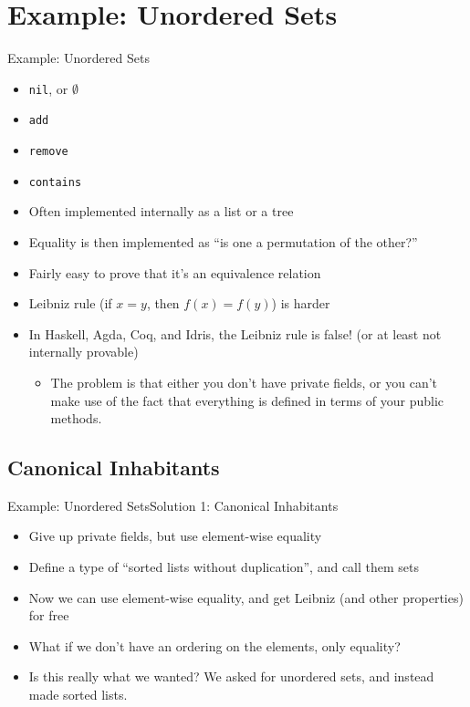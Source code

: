 \documentclass{beamer}
\begin{document}
\section{Example: Unordered Sets}
\begin{frame}{Example: Unordered Sets}
  \pause
  \begin{itemize}
    \item \texttt{nil}, or $\emptyset$ \pause
    \item \texttt{add} \pause
    \item \texttt{remove} \pause
    \item \texttt{contains} \pause
    \item Often implemented internally as a list or a tree \pause
    \item Equality is then implemented as ``is one a permutation of the other?'' \pause
    \item Fairly easy to prove that it's an equivalence relation \pause
    \item Leibniz rule (if $x = y$, then $f(x) = f(y)$) is harder
    \item In Haskell, Agda, Coq, and Idris, the Leibniz rule is false! \pause (or at least not internally provable) \pause
      \begin{itemize}
        \item The problem is that either you don't have private
          fields, or you can't make use of the fact that everything is
          defined in terms of your public methods.
      \end{itemize}
  \end{itemize}
\end{frame}

\subsection{Canonical Inhabitants}
\begin{frame}{Example: Unordered Sets}{Solution 1: Canonical Inhabitants}
  \begin{itemize}
    \item Give up private fields, but use element-wise equality \pause
    \item Define a type of ``sorted lists without duplication'', and call them sets \pause
    \item Now we can use element-wise equality, and get Leibniz (and other properties) for free \pause
    \item What if we don't have an ordering on the elements, only equality? \pause
    \item Is this really what we wanted?  We asked for unordered sets, and instead made sorted lists.
  \end{itemize}
\end{frame}
\end{document}
